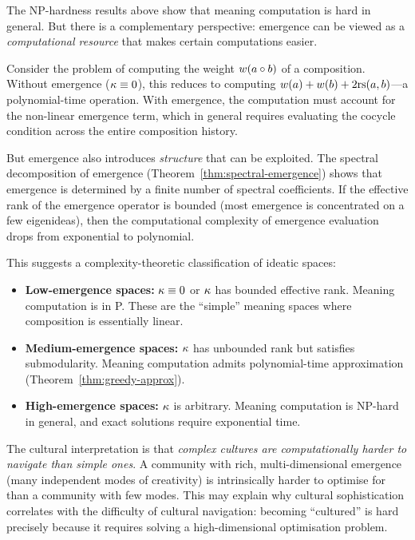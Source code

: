 \begin{remark}
The NP-hardness results above show that meaning computation is hard
in general.  But there is a complementary perspective: emergence can
be viewed as a \emph{computational resource} that makes certain
computations easier.

Consider the problem of computing the weight $w(a \circ b)$ of a
composition.  Without emergence ($\kappa \equiv 0$), this reduces to
computing $w(a) + w(b) + 2\mathrm{rs}(a,b)$---a polynomial-time operation.
With emergence, the computation must account for the non-linear
emergence term, which in general requires evaluating the cocycle
condition across the entire composition history.

But emergence also introduces \emph{structure} that can be exploited.
The spectral decomposition of emergence
(Theorem~\ref{thm:spectral-emergence}) shows that emergence is
determined by a finite number of spectral coefficients.  If the
effective rank of the emergence operator is bounded (most emergence
is concentrated on a few eigenideas), then the computational
complexity of emergence evaluation drops from exponential to
polynomial.

This suggests a complexity-theoretic classification of ideatic spaces:
\begin{itemize}
  \item \textbf{Low-emergence spaces:} $\kappa \equiv 0$ or
    $\kappa$ has bounded effective rank.  Meaning computation is in P.
    These are the ``simple'' meaning spaces where composition is
    essentially linear.
  \item \textbf{Medium-emergence spaces:} $\kappa$ has unbounded
    rank but satisfies submodularity.  Meaning computation admits
    polynomial-time approximation (Theorem~\ref{thm:greedy-approx}).
  \item \textbf{High-emergence spaces:} $\kappa$ is arbitrary.
    Meaning computation is NP-hard in general, and exact solutions
    require exponential time.
\end{itemize}

The cultural interpretation is that \emph{complex cultures are
computationally harder to navigate than simple ones}.  A community
with rich, multi-dimensional emergence (many independent modes of
creativity) is intrinsically harder to optimise for than a community
with few modes.  This may explain why cultural sophistication correlates
with the difficulty of cultural navigation: becoming ``cultured'' is
hard precisely because it requires solving a high-dimensional
optimisation problem.
\end{remark}

